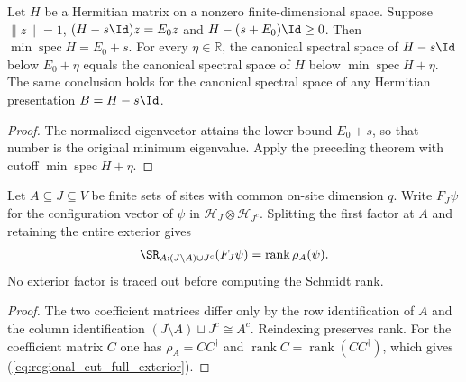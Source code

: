 \begin{corollary}
    \label{cor:canonical_centered_ground_window}
    \leanok
    Let $H$ be a Hermitian matrix on a nonzero finite-dimensional space.
    Suppose $\|z\|=1$, $(H-s\Id)z=E_0z$ and
    $H-(s+E_0)\Id\ge0$. Then
    $\min\operatorname{spec}H=E_0+s$. For every $\eta\in\mathbb R$,
    the canonical spectral space of $H-s\Id$ below $E_0+\eta$ equals
    the canonical spectral space of $H$ below
    $\min\operatorname{spec}H+\eta$. The same conclusion holds for
    the canonical spectral space of any Hermitian presentation $B=H-s\Id$.
\end{corollary}
\begin{proof}
    \leanok
    The normalized eigenvector attains the lower bound $E_0+s$, so that
    number is the original minimum eigenvalue. Apply the preceding theorem
    with cutoff $\min\operatorname{spec}H+\eta$.
\end{proof}


\begin{lemma}
    \label{thm:regional_cut_full_exterior}
    \leanok
    Let $A\subseteq J\subseteq V$ be finite sets of sites with common
    on-site dimension $q$. Write $F_J\psi$ for the configuration vector
    of $\psi$ in $\mathcal H_J\otimes\mathcal H_{J^c}$. Splitting the
    first factor at $A$ and retaining the entire exterior gives
    \begin{align}
        \SR_{A:(J\setminus A)\cup J^c}(F_J\psi)
        =\operatorname{rank}\rho_A(\psi).
        \label{eq:regional_cut_full_exterior}
    \end{align}
    No exterior factor is traced out before computing the Schmidt rank.
\end{lemma}
\begin{proof}\leanok
    The two coefficient matrices differ only by the row identification of
    $A$ and the column identification
    $(J\setminus A)\sqcup J^c\cong A^c$. Reindexing preserves rank.
    For the coefficient matrix $C$ one has $\rho_A=CC^\dagger$ and
    $\operatorname{rank}C=\operatorname{rank}(CC^\dagger)$, which gives
    (\ref{eq:regional_cut_full_exterior}).
\end{proof}


